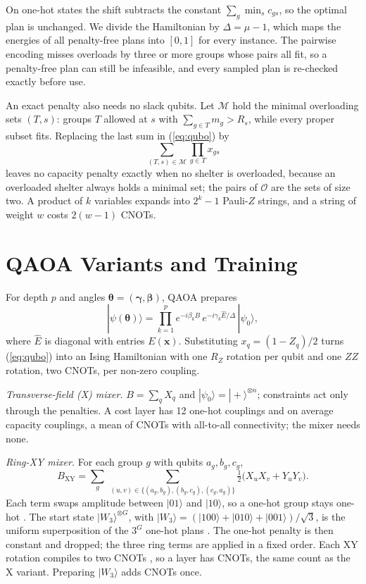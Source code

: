 \documentclass[conference]{IEEEtran}
\begin{document}
On one-hot states the shift subtracts the constant $\sum_g\min_s c_{gs}$, so the optimal plan is unchanged. We divide the Hamiltonian by $\Delta=\mu-1$, which maps the energies of all penalty-free plans into $[0,1]$ for every instance. The pairwise encoding misses overloads by three or more groups whose pairs all fit, so a penalty-free plan can still be infeasible, and every sampled plan is re-checked exactly before use.

An exact penalty also needs no slack qubits. Let $\mathcal{M}$ hold the minimal overloading sets $(T,s)$: groups $T$ allowed at $s$ with $\sum_{g\in T}m_g>R_s$, while every proper subset fits. Replacing the last sum in (\ref{eq:qubo}) by
\begin{equation}
\textstyle\sum_{(T,s)\in\mathcal{M}}\prod_{g\in T}x_{gs}
\label{eq:hubo}
\end{equation}
leaves no capacity penalty exactly when no shelter is overloaded, because an overloaded shelter always holds a minimal set; the pairs of $\mathcal{O}$ are the sets of size two. A product of $k$ variables expands into $2^k-1$ Pauli-$Z$ strings, and a string of weight $w$ costs $2(w-1)$ CNOTs.

\section{QAOA Variants and Training}
For depth $p$ and angles $\boldsymbol\theta=(\boldsymbol\gamma,\boldsymbol\beta)$, QAOA prepares
\begin{equation}
|\psi(\boldsymbol\theta)\rangle=\prod_{k=1}^{p}e^{-i\beta_k B}\,e^{-i\gamma_k \hat E/\Delta}\,|\psi_0\rangle,
\end{equation}
where $\hat E$ is diagonal with entries $E(\mathbf{x})$. Substituting $x_q=(1-Z_q)/2$ turns (\ref{eq:qubo}) into an Ising Hamiltonian with one $R_Z$ rotation per qubit and one $ZZ$ rotation, two CNOTs, per non-zero coupling.

\textit{Transverse-field (X) mixer.} $B=\sum_q X_q$ and $|\psi_0\rangle=|+\rangle^{\otimes n}$; constraints act only through the penalties. A cost layer has 12 one-hot couplings and on average \OvPairs{} capacity couplings, a mean of \CnotX{} CNOTs with all-to-all connectivity; the mixer needs none.

\textit{Ring-XY mixer.} For each group $g$ with qubits $a_g,b_g,c_g$,
\begin{equation}
B_{\mathrm{XY}}=\sum_{g}\ \sum_{(u,v)\in\{(a_g,b_g),(b_g,c_g),(c_g,a_g)\}}\tfrac12\big(X_uX_v+Y_uY_v\big).
\label{eq:xy}
\end{equation}
Each term swaps amplitude between $|01\rangle$ and $|10\rangle$, so a one-hot group stays one-hot \cite{WangZ2020}. The start state $|W_3\rangle^{\otimes G}$, with $|W_3\rangle=(|100\rangle+|010\rangle+|001\rangle)/\sqrt3$, is the uniform superposition of the $3^G$ one-hot plans \cite{Bartschi2019}. The one-hot penalty is then constant and dropped; the three ring terms are applied in a fixed order. Each XY rotation compiles to two CNOTs \cite{Vatan2004}, so a layer has \CnotXY{} CNOTs, the same count as the X variant. Preparing $|W_3\rangle$ adds \CnotW{} CNOTs once.
\end{document}
